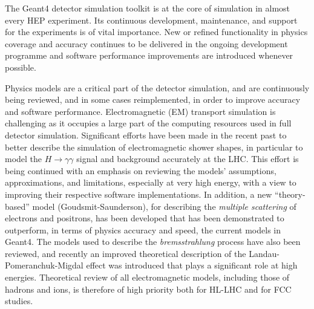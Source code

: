 The Geant4 detector simulation toolkit is at the core of simulation in
almost every HEP experiment. Its continuous development, maintenance,
and support for the experiments is of vital importance. New or refined
functionality in physics coverage and accuracy continues to be delivered
in the ongoing development programme and software
performance improvements are introduced whenever possible.

Physics models are a critical part of the detector simulation, and are
continuously being reviewed, and in some cases reimplemented, in order
to improve accuracy and software performance. Electromagnetic (EM)
transport simulation is challenging as it occupies a large part of the
computing resources used in full detector simulation. Significant
efforts have been made in the recent past to better describe the
simulation of electromagnetic shower shapes, in particular to model the
$H \to \gamma \gamma$ signal and background accurately at the LHC. This
effort is being continued with an emphasis on reviewing the models'
assumptions, approximations, and limitations, especially at very high
energy, with a view to improving their respective software
implementations. In addition, a new ``theory-based'' model
(Goudsmit-Saunderson), for describing the \emph{multiple scattering} of
electrons and positrons, has been developed that has been demonstrated
to outperform, in terms of physics accuracy and speed, the current
models in Geant4. The models used to describe the \emph{bremsstrahlung}
process have also been reviewed, and recently an improved theoretical
description of the Landau-Pomeranchuk-Migdal effect was introduced
that plays a significant role at high energies. Theoretical review of
all electromagnetic models, including those of hadrons and ions, is
therefore of high priority both for HL-LHC and for FCC studies.

